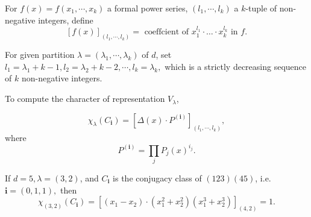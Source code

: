 \documentclass[11pt]{homework}
\begin{document}
For $f(x) = f(x_1,\cdots,x_k)$ a formal power series, $(l_1, \cdots, l_k)$ a $k$-tuple of non-negative integers, define
\begin{equation*}
    \left[f(x)\right]_{(l_1, \cdots, l_k)} = \text{ coeffcient of } x_1^{l_1}\cdot \ldots \cdot x_k^{l_k} \text{ in } f.
\end{equation*}

For given partition $\lambda = (\lambda_1,\cdots, \lambda_k)$ of $d$, set $
l_1 = \lambda_1 + k - 1, l_2 = \lambda_2 + k - 2, \cdots, l_k = \lambda_k,$ which is a strictly decreasing sequence of $k$ non-negative integers.

To compute the character of representation $V_\lambda$,
\begin{theorem}
    \label{thm:forbenius}
    \begin{equation*}
        \chi_\lambda (C_\mathbf{i}) = \left[\Delta(x) \cdot P^{(\mathbf{i})}\right]_{(l_1, \cdots , l_k)},
    \end{equation*}
    where
    \begin{equation*}
        P^{(\mathbf{i})} = \prod_j P_j(x)^{i_j}.
    \end{equation*}
\end{theorem}
\begin{example}
    If $d = 5, \lambda = (3,2)$, and $C_\mathbf{i}$ is the conjugacy class of $(123)(45)$, i.e. $\mathbf{i} = (0,1,1),$ then
    \begin{equation*}
        \chi_{(3,2)} (C_\mathbf{i}) = \left[(x_1 - x_2) \cdot (x_1^2 + x_2^2)(x_1^3 + x_2 ^3)\right]_{(4,2)} = 1.
    \end{equation*}
\end{example}


\end{document}
